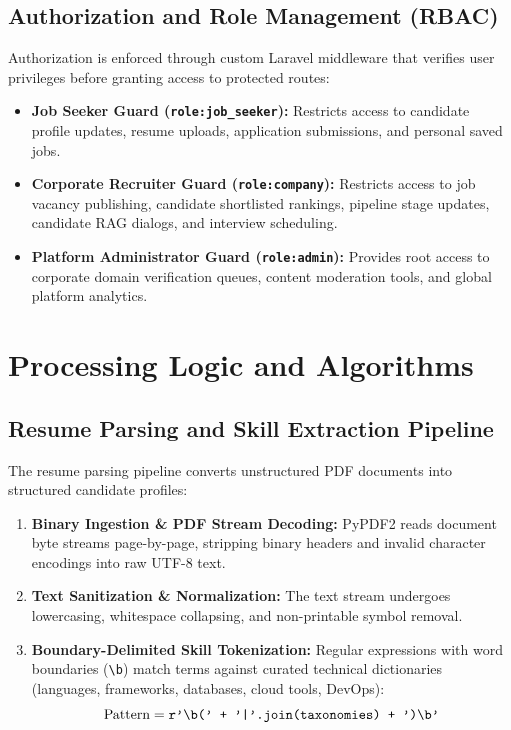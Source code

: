 \subsection{Authorization and Role Management (RBAC)}
Authorization is enforced through custom Laravel middleware that verifies user privileges before granting access to protected routes:
\begin{itemize}
    \item \textbf{Job Seeker Guard (\texttt{role:job\_seeker}):} Restricts access to candidate profile updates, resume uploads, application submissions, and personal saved jobs.
    \item \textbf{Corporate Recruiter Guard (\texttt{role:company}):} Restricts access to job vacancy publishing, candidate shortlisted rankings, pipeline stage updates, candidate RAG dialogs, and interview scheduling.
    \item \textbf{Platform Administrator Guard (\texttt{role:admin}):} Provides root access to corporate domain verification queues, content moderation tools, and global platform analytics.
\end{itemize}

\section{Processing Logic and Algorithms}

\subsection{Resume Parsing and Skill Extraction Pipeline}
The resume parsing pipeline converts unstructured PDF documents into structured candidate profiles:
\begin{enumerate}
    \item \textbf{Binary Ingestion \& PDF Stream Decoding:} PyPDF2 reads document byte streams page-by-page, stripping binary headers and invalid character encodings into raw UTF-8 text.
    \item \textbf{Text Sanitization \& Normalization:} The text stream undergoes lowercasing, whitespace collapsing, and non-printable symbol removal.
    \item \textbf{Boundary-Delimited Skill Tokenization:} Regular expressions with word boundaries (\texttt{\textbackslash b}) match terms against curated technical dictionaries (languages, frameworks, databases, cloud tools, DevOps):
    \begin{equation}
        \text{Pattern} = \text{\texttt{r'\textbackslash b(' + '|'.join(taxonomies) + ')\textbackslash b'}}
    \end{equation}
\end{enumerate}

